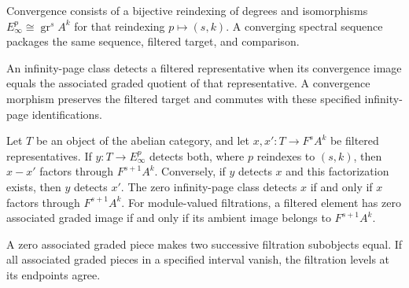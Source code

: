 \begin{definition}
\label{sem:SpectralSequence:convergence}
Convergence consists of a bijective reindexing of degrees and isomorphisms $E_\infty^p\cong\operatorname{gr}^{s}A^k$ for that reindexing $p\mapsto(s,k)$. A converging spectral sequence packages the same sequence, filtered target, and comparison.
\end{definition}

\begin{definition}
\label{sem:SpectralSequence:detection}
An infinity-page class detects a filtered representative when its convergence image equals the associated graded quotient of that representative. A convergence morphism preserves the filtered target and commutes with these specified infinity-page identifications.
\end{definition}

\begin{theorem}
\label{sem:SpectralSequence:detected-difference}
Let $T$ be an object of the abelian category, and let $x,x' : T\to F^sA^k$ be filtered representatives. If $y:T\to E_\infty^p$ detects both, where $p$ reindexes to $(s,k)$, then $x-x'$ factors through $F^{s+1}A^k$. Conversely, if $y$ detects $x$ and this factorization exists, then $y$ detects $x'$. The zero infinity-page class detects $x$ if and only if $x$ factors through $F^{s+1}A^k$. For module-valued filtrations, a filtered element has zero associated graded image if and only if its ambient image belongs to $F^{s+1}A^k$.
\end{theorem}

\begin{theorem}
\label{sem:SpectralSequence:graded-vanishing}
A zero associated graded piece makes two successive filtration subobjects equal. If all associated graded pieces in a specified interval vanish, the filtration levels at its endpoints agree.
\end{theorem}

